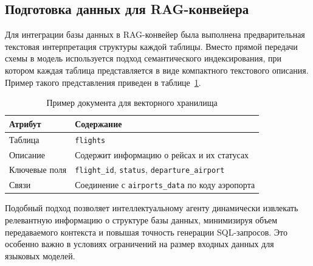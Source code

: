 \subsection{Подготовка данных для RAG-конвейера}

Для интеграции базы данных в RAG-конвейер была выполнена предварительная текстовая интерпретация структуры каждой таблицы. Вместо прямой передачи схемы в модель используется подход семантического индексирования, при котором каждая таблица представляется в виде компактного текстового описания. Пример такого представления приведен в таблице~\ref{tab:rag_doc}.

\begin{table}[h!]
\centering
\caption{Пример документа для векторного хранилища}
\label{tab:rag_doc}
\begin{tabular}{|p{3cm}|p{10cm}|}
\hline
\textbf{Атрибут} & \textbf{Содержание} \\
\hline
Таблица & \texttt{flights} \\
\hline
Описание & Содержит информацию о рейсах и их статусах \\
\hline
Ключевые поля & \texttt{flight\_id}, \texttt{status}, \texttt{departure\_airport} \\
\hline
Связи & Соединение с \texttt{airports\_data} по коду аэропорта \\
\hline
\end{tabular}
\end{table}

Подобный подход позволяет интеллектуальному агенту динамически извлекать релевантную информацию о структуре базы данных, минимизируя объем передаваемого контекста и повышая точность генерации SQL-запросов. Это особенно важно в условиях ограничений на размер входных данных для языковых моделей.
